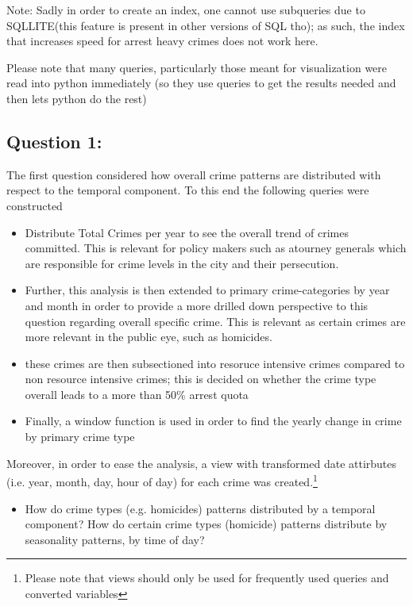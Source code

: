 \documentclass[a4paper]{article}
\begin{document}
Note: Sadly in order to create an index, one cannot use subqueries due to SQLLITE(this feature is present in other versions of SQL tho); as such, the index that increases speed for arrest heavy crimes does not work here. 


Please note that many queries, particularly those meant for visualization were read into python immediately (so they use queries to get the results needed and then lets python do the rest)

\subsection{Question 1:}

The first question considered how overall crime patterns are distributed with respect to the temporal component. To this end the following queries were constructed 
\begin{itemize}
  \item Distribute Total Crimes per year to see the overall trend of crimes committed. This is relevant for policy makers such as atourney generals which are responsible for crime levels in the city and their persecution. 
  \item Further, this analysis is then extended to primary crime-categories by year and month in order to provide a more drilled down perspective to this question regarding overall specific crime. This is relevant as certain crimes are more relevant in the public eye, such as homicides. 
  \item these crimes are then subsectioned into resoruce intensive crimes compared to non resource intensive crimes; this is decided on whether the crime type overall leads to a more than 50\% arrest quota
  \item Finally, a window function is used in order to find the yearly change in crime by primary crime type 
\end{itemize}


Moreover, in order to ease the analysis, a view with transformed date attirbutes (i.e. year, month, day, hour of day) for each crime was created.\footnote{Please note that views should only be used for frequently used queries and converted variables}


\begin{itemize}
  \item How do crime types (e.g. homicides) patterns distributed by a temporal component? How do certain crime types (homicide) patterns distribute by seasonality patterns, by time of day?
\end{itemize}
\end{document}
